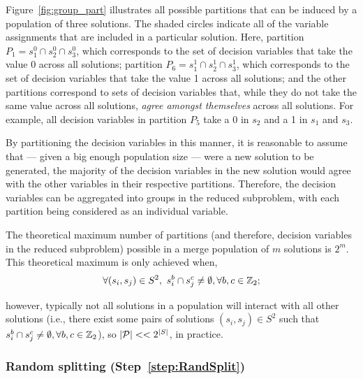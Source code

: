 \documentclass[journal]{IEEEtran}
\begin{document}
Figure~\ref{fig:group_part} illustrates all possible partitions that can be induced by a population of three solutions. The shaded circles indicate all of the variable assignments that are included in a particular solution. Here, partition $P_1=s^0_1 \cap s^0_2 \cap s^0_3$, which corresponds to the set of decision variables that take the value 0 across all solutions; partition $P_6=s^1_1 \cap s^1_2 \cap s^1_3$, which corresponds to the set of decision variables that take the value 1 across all solutions; and the other partitions correspond to sets of decision variables that, while they do not take the same value across all solutions, \emph{agree amongst themselves} across all solutions. For example, all decision variables in partition $P_5$ take a 0 in $s_2$ and a 1 in $s_1$ and $s_3$.
 
By partitioning the decision variables in this manner, it is reasonable to assume that --- given a big enough population size --- were a new solution to be generated, the majority of the decision variables in the new solution would agree with the other variables in their respective partitions. Therefore, the decision variables can be aggregated into groups in the reduced subproblem, with each partition being considered as an individual variable. 

The theoretical maximum number of partitions (and therefore, decision variables in the reduced subproblem) possible in a merge population of $m$ solutions is $2^m$. This theoretical maximum is only achieved when,
\begin{equation*}
\forall (s_i,s_j) \in S^2,\ s^b_i \cap s^c_j \neq \emptyset, \forall b,c \in \Bin; \label{sec:merge:part:bound}
\end{equation*}

however, typically not all solutions in a population will interact with all other solutions (i.e., there exist some pairs of solutions $(s_i,s_j) \in S^2$ such that $s^b_i \cap s^c_j \neq \emptyset, \forall b,c \in \mathbb{Z}_2$), so $|{\cal P}| << 2^{|S|}$, in practice.

\subsubsection*{Random splitting (Step~\ref{step:RandSplit})}
\end{document}
